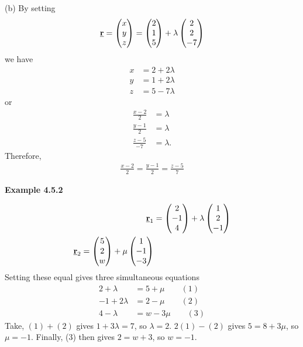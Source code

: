 (b) By setting 
\begin{align*}
    \underline{\mathbf{r}} = \begin{pmatrix} x \\ y \\ z \end{pmatrix} = \begin{pmatrix} 2 \\ 1 \\ 5 \end{pmatrix} + \lambda\begin{pmatrix} 2 \\ 2 \\ -7 \end{pmatrix}
\end{align*}
we have 
\begin{align*}
    x &= 2 + 2\lambda \\
    y &= 1 + 2\lambda \\
    z &= 5 - 7\lambda
\end{align*}
or
\begin{align*}
    \frac{x-2}{2} &= \lambda \\
    \frac{y-1}{2} &= \lambda \\
    \frac{z-5}{-7} &= \lambda.
\end{align*}
Therefore, 
\begin{align*}
    \frac{x-2}{2} = \frac{y-1}{2} = \frac{z-5}{7}
\end{align*}

\vspace{5mm} 

\textbf{Example 4.5.2} \par

\begin{align*}
\underline{\mathbf{r}}_1 &= \begin{pmatrix} 2 \\ -1 \\ 4 \end{pmatrix} + \lambda \begin{pmatrix} 1 \\ 2 \\ -1 \end{pmatrix}\\
\underline{\mathbf{r}}_2 = \begin{pmatrix} 5 \\ 2 \\ w \end{pmatrix} + \mu \begin{pmatrix} 1 \\ -1 \\ -3 \end{pmatrix}
\end{align*}
Setting these equal gives three simultaneous equations
\begin{align*}
2 + \lambda &= 5 + \mu \qquad (1)\\
-1 + 2\lambda &= 2 - \mu \qquad (2)\\
4 - \lambda &= w - 3\mu \qquad (3)
\end{align*}
Take, $(1) + (2)$ gives $1 + 3\lambda = 7$, so $\lambda = 2$. $2(1)-(2)$ gives $5 = 8 + 3\mu$, so $\mu = -1$. Finally, (3) then gives $2 = w+3$, so $w=-1$. 

